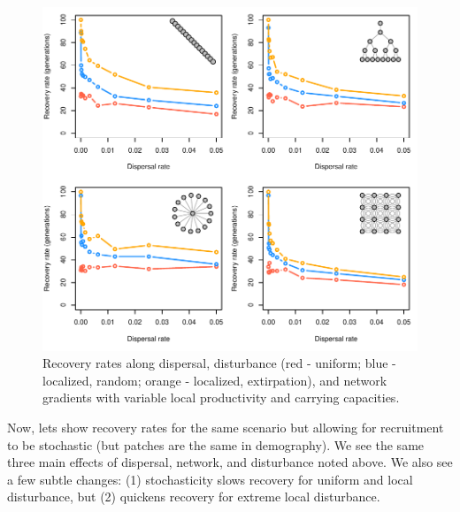 \documentclass[]{article}
\begin{document}
\begin{figure}[H]

{\centering \includegraphics{Managing_for_ecological_surprises_in_metapopulations_files/figure-latex/results for variables patches-1} 

}

\caption{Recovery rates along dispersal, disturbance (red - uniform; blue - localized, random; orange - localized, extirpation), and network gradients with variable local productivity and carrying capacities.}\label{fig:results for variables patches}
\end{figure}
\newpage

Now, lets show recovery rates for the same scenario but allowing for
recruitment to be stochastic (but patches are the same in demography).
We see the same three main effects of dispersal, network, and
disturbance noted above. We also see a few subtle changes: (1)
stochasticity slows recovery for uniform and local disturbance, but (2)
quickens recovery for extreme local disturbance.
\end{document}
